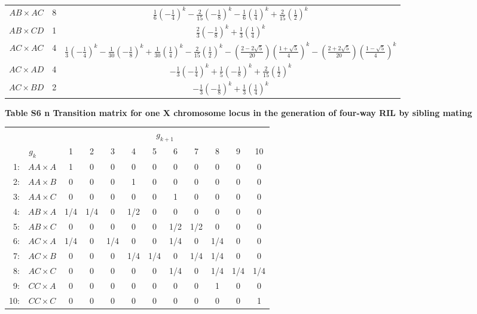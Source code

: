 \documentclass[9pt,letterpaper,twoside]{article}
\begin{document}
{\begin{center}
\begin{tabular}{ccc}
$AB \times AC$ & 8 & $\frac{1}{6}\left(-\frac{1}{4}\right)^k-\frac{2}{15}\left(-\frac{1}{8}\right)^k-\frac{1}{6}\left(\frac{1}{4}\right)^k+\frac{2}{15}\left(\frac{1}{2}\right)^k$ \\ 
$AB \times CD$ & 1 & $\frac{2}{3}\left(-\frac{1}{8}\right)^k+\frac{1}{3}\left(\frac{1}{4}\right)^k$ \\ 
$AC \times AC$ & 4 & $\frac{1}{3}\left(-\frac{1}{4}\right)^k-\frac{1}{30}\left(-\frac{1}{8}\right)^k+\frac{1}{30}\left(\frac{1}{4}\right)^k-\frac{2}{15}\left(\frac{1}{2}\right)^k -\left(\frac{2-2\sqrt{5}}{20}\right)\left(\frac{1+\sqrt{5}}{4}\right)^k-\left(\frac{2+2\sqrt{5}}{20}\right)\left(\frac{1-\sqrt{5}}{4}\right)^k$ \\ 
$AC \times AD$ & 4 & $-\frac{1}{3}\left(-\frac{1}{4}\right)^k + \frac{1}{5}\left(-\frac{1}{8}\right)^k+\frac{2}{15}\left(\frac{1}{2}\right)^k$ \\ 
$AC \times BD$ & 2 & $-\frac{1}{3}\left(-\frac{1}{8}\right)^k + \frac{1}{3}\left(\frac{1}{4}\right)^k$ \\ 
\hline
\end{tabular}
\end{center}

}

\newpage


\noindent \textbf{Table S6 {\color{white} n} Transition matrix for one X chromosome
locus in the generation of four-way RIL by sibling mating}

\bigskip

{
\begin{center}
\begin{tabular}{rc@{\hspace{10mm}}cccccccccc} \hline
 && \multicolumn{10}{c}{$g_{k+1}$} \\ \cline{3-12}
\multicolumn{2}{c}{$g_k$}  & 1 & 2 & 3 & 4 & 5 & 6 & 7 & 8 & 9 & 10\\ \hline
1: & $AA \times A$ & 1 & 0 & 0 & 0 & 0 & 0 & 0 & 0 & 0 & 0 \\ 
2: & $AA \times B$ & 0 & 0 & 0 & 1 & 0 & 0 & 0 & 0 & 0 & 0 \\ 
3: & $AA \times C$ & 0 & 0 & 0 & 0 & 0 & 1 & 0 & 0 & 0 & 0 \\ 
4: & $AB \times A$ & 1/4 & 1/4 & 0 & 1/2 & 0 & 0 & 0 & 0 & 0 & 0 \\ 
5: & $AB \times C$ & 0 & 0 & 0 & 0 & 0 & 1/2 & 1/2 & 0 & 0 & 0 \\ 
6: & $AC \times A$ & 1/4 & 0 & 1/4 & 0 & 0 & 1/4 & 0 & 1/4 & 0 & 0 \\ 
7: & $AC \times B$ & 0 & 0 & 0 & 1/4 & 1/4 & 0 & 1/4 & 1/4 & 0 & 0 \\ 
8: & $AC \times C$ & 0 & 0 & 0 & 0 & 0 & 1/4 & 0 & 1/4 & 1/4 & 1/4 \\ 
9: & $CC \times A$ & 0 & 0 & 0 & 0 & 0 & 0 & 0 & 1 & 0 & 0 \\ 
10: & $CC \times C$ & 0 & 0 & 0 & 0 & 0 & 0 & 0 & 0 & 0 & 1 \\ 
\hline
\end{tabular}
\end{center}

}
\end{document}
